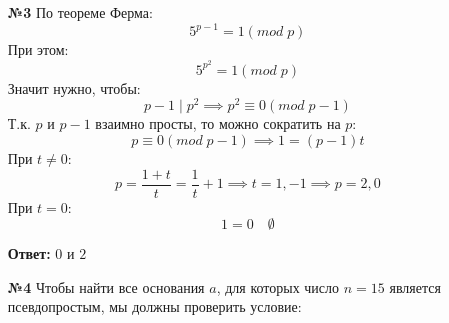 \documentclass[a4paper]{article}
\newcommand{\mat}[1]{\begin{pmatrix} #1 \end{pmatrix}}
\renewcommand{\f}[2]{\frac{#1}{#2}}
\newcommand{\ZZ}{\mathbb{Z}}
\newcommand{\divides}{\;|\;}
\begin{document}
\begin{enumerate}

    \item[\textbf{№3}]По теореме Ферма:
    $$5^{p-1} = 1 (mod \; p)$$
    При этом:
    $$5^{p^2} = 1 (mod \; p)$$
    Значит нужно, чтобы:
    $$p-1 \divides p^2 \implies p^2 \equiv 0 (mod \; p-1)$$
    Т.к. $p$ и $p-1$ взаимно просты, то можно сократить на $p$:
    $$p \equiv 0 (mod \; p-1) \implies 1 = (p-1)t $$
    При $t \neq 0$:
    $$ p = \f{1+t}{t} = \f{1}{t}+1 \implies t = 1, -1 \implies p = 2, 0$$
    При $t = 0$:
    $$1 = 0 \quad \emptyset$$
    
    \textbf{Ответ:} $0$ и $2$

    \item[\textbf{№4}]Чтобы найти все основания $ a $, для которых число $ n = 15 $ является псевдопростым, мы должны проверить условие:


\end{enumerate}
\end{document}
